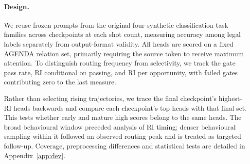 \paragraph{Design.}
We reuse frozen prompts from the original four synthetic classification task
families across checkpoints at each shot count, measuring accuracy among legal labels
separately from output-format validity. All heads are scored on a fixed AGENDA
relation set, primarily requiring the source token to receive maximum attention.
To distinguish routing frequency from selectivity, we track the gate pass rate,
RI conditional on passing, and RI per opportunity, with failed gates contributing
zero to the last measure.

Rather than selecting rising trajectories, we trace the final checkpoint's
highest-RI heads backwards and compare each checkpoint's top heads with that
final set. This tests whether early and mature high scores belong to the same
heads. The broad behavioural window preceded analysis of RI timing; denser
behavioural sampling within it followed an observed routing peak and is treated
as targeted follow-up. Coverage, preprocessing differences and statistical tests
are detailed in Appendix~\ref{app:dev}.
